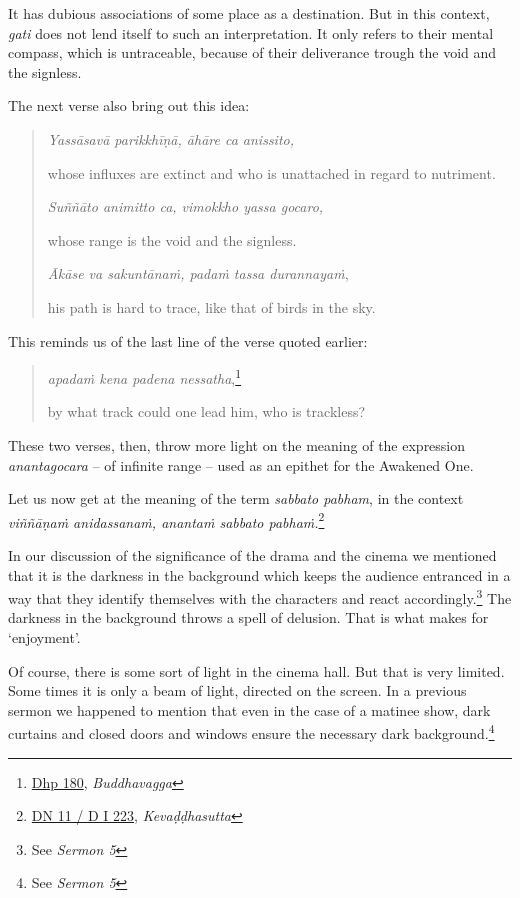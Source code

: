 It has dubious associations of some place as a destination. But in this context, \emph{gati} does not lend itself to such an interpretation. It only refers to their mental compass, which is untraceable, because of their deliverance trough the void and the signless.

The next verse also bring out this idea:

\begin{quote}
\emph{Yassāsavā parikkhīṇā, āhāre ca anissito,}

whose influxes are extinct and who is unattached in regard to nutriment.

\emph{Suññāto animitto ca, vimokkho yassa gocaro,}

whose range is the void and the signless.

\emph{Ākāse va sakuntānaṁ, padaṁ tassa durannayaṁ},

his path is hard to trace, like that of birds in the sky.
\end{quote}

This reminds us of the last line of the verse quoted earlier:

\begin{quote}
\emph{apadaṁ kena padena nessatha},\footnote{\href{https://suttacentral.net/dhp179-196/pli/ms}{Dhp 180}, \emph{Buddhavagga}}

by what track could one lead him, who is trackless?
\end{quote}

These two verses, then, throw more light on the meaning of the expression \emph{anantagocara} -- of infinite range -- used as an epithet for the Awakened One.

Let us now get at the meaning of the term \emph{sabbato pabham}, in the context \emph{viññāṇaṁ anidassanaṁ, anantaṁ sabbato pabhaṁ.}\footnote{\href{https://suttacentral.net/dn11/pli/ms}{DN 11 / D I 223}, \emph{Kevaḍḍhasutta}}

In our discussion of the significance of the drama and the cinema we mentioned that it is the darkness in the background which keeps the audience entranced in a way that they identify themselves with the characters and react accordingly.\footnote{See \emph{Sermon 5}} The darkness in the background throws a spell of delusion. That is what makes for `enjoyment'.

Of course, there is some sort of light in the cinema hall. But that is very limited. Some times it is only a beam of light, directed on the screen. In a previous sermon we happened to mention that even in the case of a matinee show, dark curtains and closed doors and windows ensure the necessary dark background.\footnote{See \emph{Sermon 5}}

